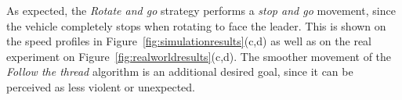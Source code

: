 \documentclass[journal]{IEEEtran}
\begin{document}



As expected, the \textit{Rotate and go} strategy performs a \textit{stop and go} movement, since the vehicle completely stops when rotating to face the leader. This is shown on the speed profiles in Figure~\ref{fig:simulationresults}(c,d) as well as on the real experiment on Figure~\ref{fig:realworldresults}(c,d).    The smoother movement of the \textit{Follow the thread} algorithm is an additional desired goal, since it can be perceived as less violent or unexpected. %




\end{document}
